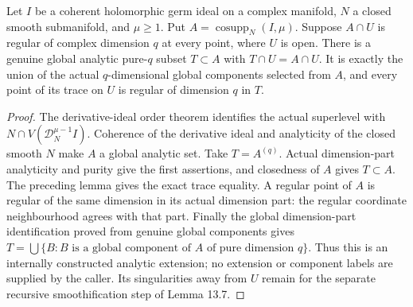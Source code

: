 \begin{theorem}
\label{hir:actual-order-stratum-global-analytic-extension}
\leanok
Let $I$ be a coherent holomorphic germ ideal on a complex manifold, $N$ a
closed smooth submanifold, and $\mu\ge1$. Put $A=\operatorname{cosupp}_N(I,\mu)$.
Suppose $A\cap U$ is regular of complex dimension $q$ at every point, where
$U$ is open. There is a genuine global analytic pure-$q$ subset $T\subset A$
with $T\cap U=A\cap U$. It is exactly the union of the actual $q$-dimensional global components
selected from $A$, and every point
of its trace on $U$ is regular of dimension $q$ in $T$.
\end{theorem}
\begin{proof}
The derivative-ideal order theorem identifies the actual superlevel with
$N\cap V(\mathcal D_N^{\mu-1} I)$. Coherence of the derivative ideal and
analyticity of the closed smooth $N$ make $A$ a global analytic set. Take
$T=A^{(q)}$. Actual dimension-part analyticity and purity give the first
assertions, and closedness of $A$ gives $T\subset A$. The preceding lemma
gives the exact trace equality. A regular point of $A$ is regular of the
same dimension in its actual dimension part: the regular coordinate
neighbourhood agrees with that part. Finally the global dimension-part
identification proved from genuine global components gives
$T=\bigcup\{B:B\text{ is a global component of }A\text{ of pure dimension }q\}$.
Thus this is an internally constructed analytic extension; no extension or
component labels are supplied by the caller. Its singularities away from
$U$ remain for the separate recursive smoothification step of Lemma 13.7.
\end{proof}
